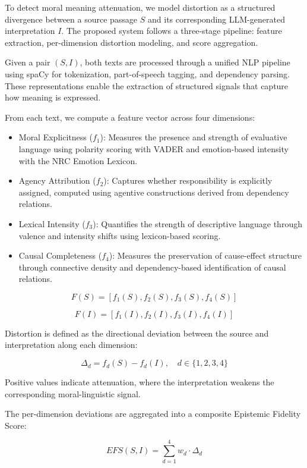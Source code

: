 \documentclass[10pt, conference]{IEEEtran}
\begin{document}
To detect moral meaning attenuation, we model distortion as a structured divergence between a source passage $S$ and its corresponding LLM-generated interpretation $I$. The proposed system follows a three-stage pipeline: feature extraction, per-dimension distortion modeling, and score aggregation.

Given a pair $(S, I)$, both texts are processed through a unified NLP pipeline using spaCy for tokenization, part-of-speech tagging, and dependency parsing. These representations enable the extraction of structured signals that capture how meaning is expressed.

From each text, we compute a feature vector across four dimensions:

\begin{itemize}
    \item Moral Explicitness ($f_1$): Measures the presence and strength of evaluative language using polarity scoring with VADER and emotion-based intensity with the NRC Emotion Lexicon.

    \item Agency Attribution ($f_2$): Captures whether responsibility is explicitly assigned, computed using agentive constructions derived from dependency relations.

    \item Lexical Intensity ($f_3$): Quantifies the strength of descriptive language through valence and intensity shifts using lexicon-based scoring.

    \item Causal Completeness ($f_4$): Measures the preservation of cause-effect structure through connective density and dependency-based identification of causal relations.
\end{itemize}

\[
F(S) = [f_1(S), f_2(S), f_3(S), f_4(S)]
\]

\[
F(I) = [f_1(I), f_2(I), f_3(I), f_4(I)]
\]

Distortion is defined as the directional deviation between the source and interpretation along each dimension:

\[
\Delta_d = f_d(S) - f_d(I), \quad d \in \{1,2,3,4\}
\]

Positive values indicate attenuation, where the interpretation weakens the corresponding moral-linguistic signal.

The per-dimension deviations are aggregated into a composite Epistemic Fidelity Score:

\[
EFS(S, I) = \sum_{d=1}^{4} w_d \cdot \Delta_d
\]
\end{document}
